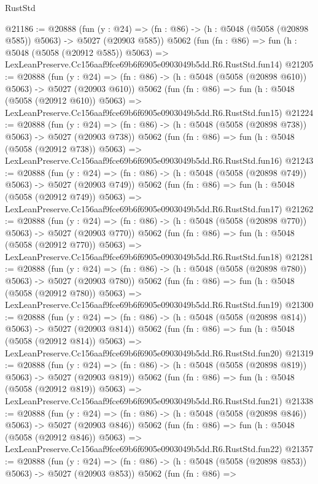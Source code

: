 \begin{lexlean}{RustStd}
\begin{coremodule}
@21186 := @20888
    (fun (y : @24) => (fn : @86) -> (h : @5048 (@5058 (@20898 @585)) @5063) -> @5027 (@20903 @585))
    @5062
    (fun (fn : @86) =>
    fun (h : @5048 (@5058 (@20912 @585)) @5063) =>
    LexLeanPreserve.Cc156aaf9fce69b6f6905e0903049b5dd.R6.RustStd.fun14)
@21205 := @20888
    (fun (y : @24) => (fn : @86) -> (h : @5048 (@5058 (@20898 @610)) @5063) -> @5027 (@20903 @610))
    @5062
    (fun (fn : @86) =>
    fun (h : @5048 (@5058 (@20912 @610)) @5063) =>
    LexLeanPreserve.Cc156aaf9fce69b6f6905e0903049b5dd.R6.RustStd.fun15)
@21224 := @20888
    (fun (y : @24) => (fn : @86) -> (h : @5048 (@5058 (@20898 @738)) @5063) -> @5027 (@20903 @738))
    @5062
    (fun (fn : @86) =>
    fun (h : @5048 (@5058 (@20912 @738)) @5063) =>
    LexLeanPreserve.Cc156aaf9fce69b6f6905e0903049b5dd.R6.RustStd.fun16)
@21243 := @20888
    (fun (y : @24) => (fn : @86) -> (h : @5048 (@5058 (@20898 @749)) @5063) -> @5027 (@20903 @749))
    @5062
    (fun (fn : @86) =>
    fun (h : @5048 (@5058 (@20912 @749)) @5063) =>
    LexLeanPreserve.Cc156aaf9fce69b6f6905e0903049b5dd.R6.RustStd.fun17)
@21262 := @20888
    (fun (y : @24) => (fn : @86) -> (h : @5048 (@5058 (@20898 @770)) @5063) -> @5027 (@20903 @770))
    @5062
    (fun (fn : @86) =>
    fun (h : @5048 (@5058 (@20912 @770)) @5063) =>
    LexLeanPreserve.Cc156aaf9fce69b6f6905e0903049b5dd.R6.RustStd.fun18)
@21281 := @20888
    (fun (y : @24) => (fn : @86) -> (h : @5048 (@5058 (@20898 @780)) @5063) -> @5027 (@20903 @780))
    @5062
    (fun (fn : @86) =>
    fun (h : @5048 (@5058 (@20912 @780)) @5063) =>
    LexLeanPreserve.Cc156aaf9fce69b6f6905e0903049b5dd.R6.RustStd.fun19)
@21300 := @20888
    (fun (y : @24) => (fn : @86) -> (h : @5048 (@5058 (@20898 @814)) @5063) -> @5027 (@20903 @814))
    @5062
    (fun (fn : @86) =>
    fun (h : @5048 (@5058 (@20912 @814)) @5063) =>
    LexLeanPreserve.Cc156aaf9fce69b6f6905e0903049b5dd.R6.RustStd.fun20)
@21319 := @20888
    (fun (y : @24) => (fn : @86) -> (h : @5048 (@5058 (@20898 @819)) @5063) -> @5027 (@20903 @819))
    @5062
    (fun (fn : @86) =>
    fun (h : @5048 (@5058 (@20912 @819)) @5063) =>
    LexLeanPreserve.Cc156aaf9fce69b6f6905e0903049b5dd.R6.RustStd.fun21)
@21338 := @20888
    (fun (y : @24) => (fn : @86) -> (h : @5048 (@5058 (@20898 @846)) @5063) -> @5027 (@20903 @846))
    @5062
    (fun (fn : @86) =>
    fun (h : @5048 (@5058 (@20912 @846)) @5063) =>
    LexLeanPreserve.Cc156aaf9fce69b6f6905e0903049b5dd.R6.RustStd.fun22)
@21357 := @20888
    (fun (y : @24) => (fn : @86) -> (h : @5048 (@5058 (@20898 @853)) @5063) -> @5027 (@20903 @853))
    @5062
    (fun (fn : @86) =>

\end{coremodule}
\end{lexlean}
